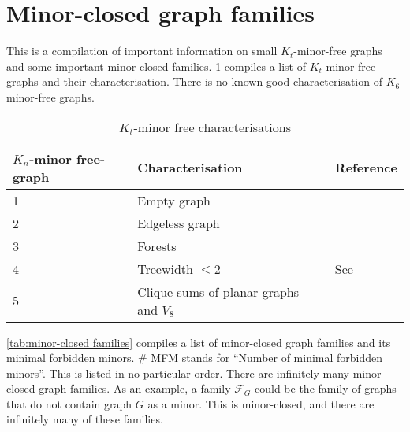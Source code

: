 \section{Minor-closed graph families}\label{sec:minor_closed_families}
This is a compilation of important information on small $K_t$-minor-free graphs and some important minor-closed families. \cref{tab:kt_minor_free} compiles a list of $K_t$-minor-free graphs and their characterisation. There is no known good characterisation of $K_6$-minor-free graphs. 

\begin{table}[h!]
    \centering
    \caption{$K_t$-minor free characterisations}\label{tab:kt_minor_free}
    \begin{tabular*}{\textwidth}{@{}lll@{}}
        \toprule
        $K_n$-minor free-graph  & Characterisation  & Reference \\
        \midrule
        1                       & Empty graph       &           \\
        2                       & Edgeless graph    &           \\
        3                       & Forests           &           \\
        4                       & Treewidth $\leq 2$&  See {\textcite{norinMath599GraphMinors2017}}         \\
        5                       & Clique-sums of planar graphs and $V_8$ & {\textcite{wagnerUeberEigenschaftEbenen1937}}\\
        \bottomrule
    \end{tabular*}
\end{table}

\cref{tab:minor-closed families} compiles a list of minor-closed graph families and its minimal forbidden minors. \# MFM stands for ``Number of minimal forbidden minors''.
This is listed in no particular order. There are infinitely many minor-closed graph families. As an example, a family $\mathcal{F}_G$ could be the family of graphs that do not contain graph $G$ as a minor. This is minor-closed, and there are infinitely many of these families.

